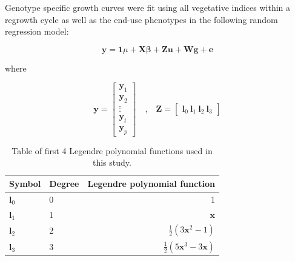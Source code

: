 \documentclass[12pt, letterpaper]{article}
\begin{document}
Genotype specific growth curves were fit using all vegetative indices within a regrowth cycle as well as the end-use phenotypes in the following random regression model:


\begin{equation} \label{rr}
	 \mathbf{y} = \mathbf{1} \mu + \mathbf{X} \boldsymbol{\beta} + \mathbf{Z}\mathbf{u} + \mathbf{W}\mathbf{g} + \mathbf{e} 
\end{equation}

\noindent where 


\begin{equation}
 \mathbf{y} = \begin{bmatrix}
    \mathbf{y}_1 \\
    \mathbf{y}_2 \\
    \vdots \\
    \mathbf{y}_t \\
    \mathbf{y}_p
  \end{bmatrix} \quad \text{,} \quad \mathbf{Z} = \begin{bmatrix}
    \mathbf{l}_0 \ \mathbf{l}_1 \ \mathbf{l}_2 \ \mathbf{l}_3
  \end{bmatrix}
\end{equation}

\begin{table} 
\caption{Table of first 4 Legendre polynomial functions used in this study.}
\label{tab:abc}
\begin{tabular*}{\hsize}{@{\extracolsep{\fill}}llr}
	 Symbol & Degree & Legendre polynomial function \\ 
	 \hline
	 $\mathbf{l}_0$ & 0 & 1 \\
	 $\mathbf{l}_1$ & 1 & $\mathbf{x}$ \\
	 $\mathbf{l}_2$ & 2 & $\frac{1}{2}(3\mathbf{x}^2 - 1)$ \\
	 $\mathbf{l}_3$ & 3 & $\frac{1}{2}(5\mathbf{x}^3 - 3\mathbf{x})$ \\
	 \hline
\end{tabular*}
\end{table}
\end{document}
